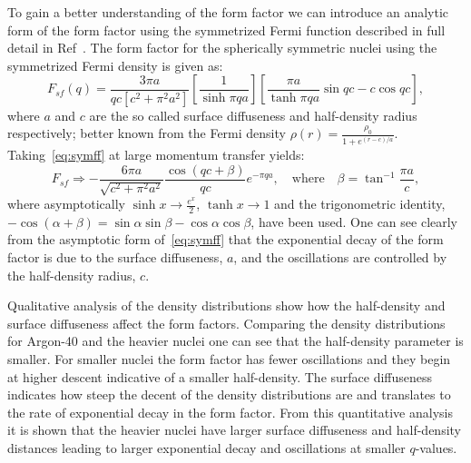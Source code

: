 To gain a better understanding of the form factor we can introduce an analytic form of the form factor using the symmetrized Fermi function described in full detail in Ref~\cite{piekarewicz:2016:power}. The form factor for the spherically symmetric nuclei using the symmetrized Fermi density is given as:
\begin{equation}\label{eq:symff}
F_{sf}(q) = \frac{3\pi a}{qc[c^2+\pi ^2 a^2]}\left[ \frac{1}{\sinh \pi qa}\right] \left[\frac{\pi a}{\tanh\pi qa}\sin qc - c\cos qc\right],
\end{equation}
where $a$ and $c$ are the so called surface diffuseness and half-density radius respectively; better known from the Fermi density $\rho (r)=\frac{\rho _0}{1+e^{(r-c)/a}}$. Taking~\eqref{eq:symff} at large momentum transfer yields:
\begin{equation}
F_{sf} \Longrightarrow -\frac{6\pi a}{\sqrt{c^2+\pi ^2 a^2}}\frac{\cos(qc+\beta )}{qc}e^{-\pi q a},\quad \text{where}\quad 
\beta = \tan ^{-1} \frac{\pi a}{c},
\end{equation}
where asymptotically $\sinh x \rightarrow\frac{e^x}{2}$, $\tanh x\rightarrow 1$ and the trigonometric identity, $-\cos (\alpha +\beta)= \sin\alpha \sin\beta - \cos\alpha \cos\beta$, have been used. One can see clearly from the asymptotic form of~\eqref{eq:symff} that the exponential decay of the form factor is due to the surface diffuseness, $a$, and the oscillations are controlled by the half-density radius, $c$.

Qualitative analysis of the density distributions show how the half-density and surface diffuseness affect the form factors. Comparing the density distributions for Argon-40 and the heavier nuclei one can see that the half-density parameter is smaller. For smaller nuclei the form factor has fewer oscillations and they begin at higher descent indicative of a smaller half-density. The surface diffuseness indicates how steep the decent of the density distributions are and translates to the rate of exponential decay in the form factor. From this quantitative analysis it is shown that the heavier nuclei have larger surface diffuseness and half-density distances leading to larger exponential decay and oscillations at smaller $q$-values.

